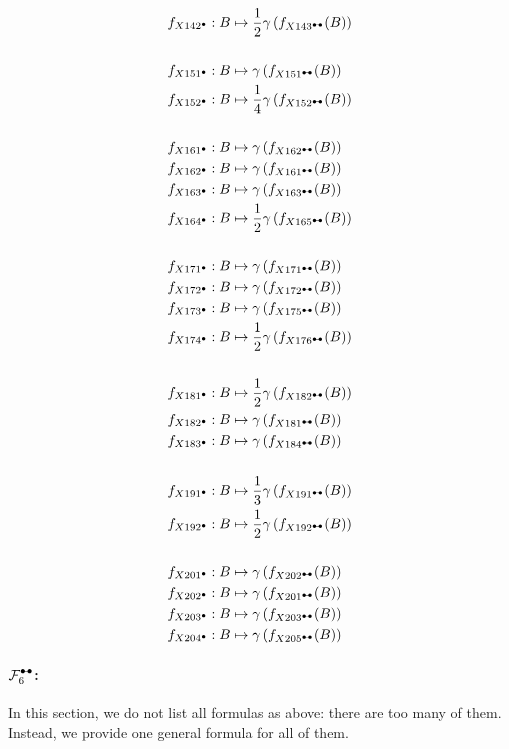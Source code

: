 \documentclass{article}
\theoremstyle{plain}
\begin{document}
\begin{align*}
f_{X142^\bullet}: B&\mapsto
 \frac{1}{2}\gamma\left(f_{X143^\dumbbell}(B)\right)\\&\\
f_{X151^\bullet}: B&\mapsto
 \gamma\left(f_{X151^\dumbbell}(B)\right)\\
f_{X152^\bullet}: B&\mapsto
 \frac{1}{4}\gamma\left(f_{X152^\dumbbell}(B)\right)\\&\\
f_{X161^\bullet}: B&\mapsto
 \gamma\left(f_{X162^\dumbbell}(B)\right)\\
f_{X162^\bullet}: B&\mapsto
 \gamma\left(f_{X161^\dumbbell}(B)\right)\\
f_{X163^\bullet}: B&\mapsto
 \gamma\left(f_{X163^\dumbbell}(B)\right)\\
f_{X164^\bullet}: B&\mapsto
 \frac{1}{2}\gamma\left(f_{X165^\dumbbell}(B)\right)\\&\\
f_{X171^\bullet}: B&\mapsto
 \gamma\left(f_{X171^\dumbbell}(B)\right)\\
f_{X172^\bullet}: B&\mapsto
 \gamma\left(f_{X172^\dumbbell}(B)\right)\\
f_{X173^\bullet}: B&\mapsto
 \gamma\left(f_{X175^\dumbbell}(B)\right)\\
f_{X174^\bullet}: B&\mapsto
 \frac{1}{2}\gamma\left(f_{X176^\dumbbell}(B)\right)\\&\\
f_{X181^\bullet}: B&\mapsto
 \frac{1}{2}\gamma\left(f_{X182^\dumbbell}(B)\right)\\
f_{X182^\bullet}: B&\mapsto
 \gamma\left(f_{X181^\dumbbell}(B)\right)\\
f_{X183^\bullet}: B&\mapsto
 \gamma\left(f_{X184^\dumbbell}(B)\right)\\&\\
f_{X191^\bullet}: B&\mapsto
 \frac{1}{3}\gamma\left(f_{X191^\dumbbell}(B)\right)\\
f_{X192^\bullet}: B&\mapsto
 \frac{1}{2}\gamma\left(f_{X192^\dumbbell}(B)\right)\\&\\
f_{X201^\bullet}: B&\mapsto
 \gamma\left(f_{X202^\dumbbell}(B)\right)\\
f_{X202^\bullet}: B&\mapsto
 \gamma\left(f_{X201^\dumbbell}(B)\right)\\
f_{X203^\bullet}: B&\mapsto
 \gamma\left(f_{X203^\dumbbell}(B)\right)\\
f_{X204^\bullet}: B&\mapsto
 \gamma\left(f_{X205^\dumbbell}(B)\right)
\end{align*}
\paragraph{$\mathcal{F}_6^{\textcolor{black}{\bullet\!\!-\!\!\bullet}}$:}
In this section, we do not list all formulas as above: there are too many of them. Instead, we provide one general formula for all of them. 
\end{document}
